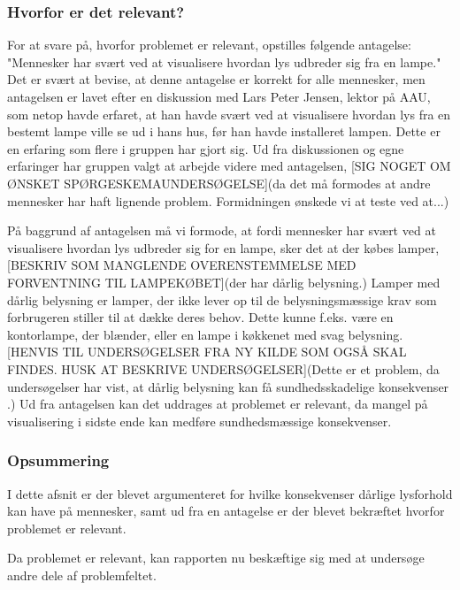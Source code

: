 \subsubsection{Hvorfor er det relevant?}
\label{sec:hvorfor_relavant}
For at svare på, hvorfor problemet er relevant, opstilles følgende antagelse: "Mennesker har svært ved at visualisere hvordan lys udbreder sig fra en lampe." Det er svært at bevise, at denne antagelse er korrekt for alle mennesker, men antagelsen er lavet efter en diskussion med Lars Peter Jensen, lektor på AAU, som netop havde erfaret, at han havde svært ved at visualisere hvordan lys fra en bestemt lampe ville se ud i hans hus, før han havde installeret lampen. Dette er en erfaring som flere i gruppen har gjort sig. Ud fra diskussionen og egne erfaringer har gruppen valgt at arbejde videre med antagelsen, [SIG NOGET OM ØNSKET SPØRGESKEMAUNDERSØGELSE](da det må formodes at andre mennesker har haft lignende problem. Formidningen ønskede vi at teste ved at...)

På baggrund af antagelsen må vi formode, at fordi mennesker har svært ved at visualisere hvordan lys udbreder sig for en lampe, sker det at der købes lamper, [BESKRIV SOM MANGLENDE OVERENSTEMMELSE MED FORVENTNING TIL LAMPEKØBET](der har dårlig belysning.) Lamper med dårlig belysning er lamper, der ikke lever op til de belysningsmæssige krav som forbrugeren stiller til at dække deres behov. Dette kunne f.eks. være en kontorlampe, der blænder, eller en lampe i køkkenet med svag belysning. [HENVIS TIL UNDERSØGELSER FRA NY KILDE SOM OGSÅ SKAL FINDES. HUSK AT BESKRIVE UNDERSØGELSER](Dette er et problem, da undersøgelser har vist, at dårlig belysning kan få sundhedsskadelige konsekvenser \cite{lys_konsekvenser}.) Ud fra antagelsen kan det  uddrages at problemet er relevant, da mangel på visualisering i sidste ende kan medføre sundhedsmæssige konsekvenser.

\subsubsection*{Opsummering}
I dette afsnit er der blevet argumenteret for hvilke konsekvenser dårlige lysforhold kan have på mennesker, samt ud fra en antagelse er der blevet bekræftet hvorfor problemet er relevant. 

Da problemet er relevant, kan rapporten nu beskæftige sig med at undersøge andre dele af problemfeltet. 
